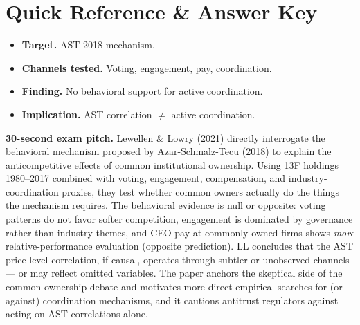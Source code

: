 \documentclass[11pt]{article}
\begin{document}
\section*{Quick Reference \& Answer Key}
\begin{answerbox}
\begin{itemize}
\item \textbf{Target.} AST 2018 mechanism.
\item \textbf{Channels tested.} Voting, engagement, pay, coordination.
\item \textbf{Finding.} No behavioral support for active coordination.
\item \textbf{Implication.} AST correlation $\ne$ active coordination.
\end{itemize}
\end{answerbox}

\begin{keybox}
\textbf{30-second exam pitch.} Lewellen \& Lowry (2021) directly interrogate the behavioral mechanism proposed by Azar-Schmalz-Tecu (2018) to explain the anticompetitive effects of common institutional ownership. Using 13F holdings 1980--2017 combined with voting, engagement, compensation, and industry-coordination proxies, they test whether common owners actually do the things the mechanism requires. The behavioral evidence is null or opposite: voting patterns do not favor softer competition, engagement is dominated by governance rather than industry themes, and CEO pay at commonly-owned firms shows \emph{more} relative-performance evaluation (opposite prediction). LL concludes that the AST price-level correlation, if causal, operates through subtler or unobserved channels --- or may reflect omitted variables. The paper anchors the skeptical side of the common-ownership debate and motivates more direct empirical searches for (or against) coordination mechanisms, and it cautions antitrust regulators against acting on AST correlations alone.
\end{keybox}
\end{document}
